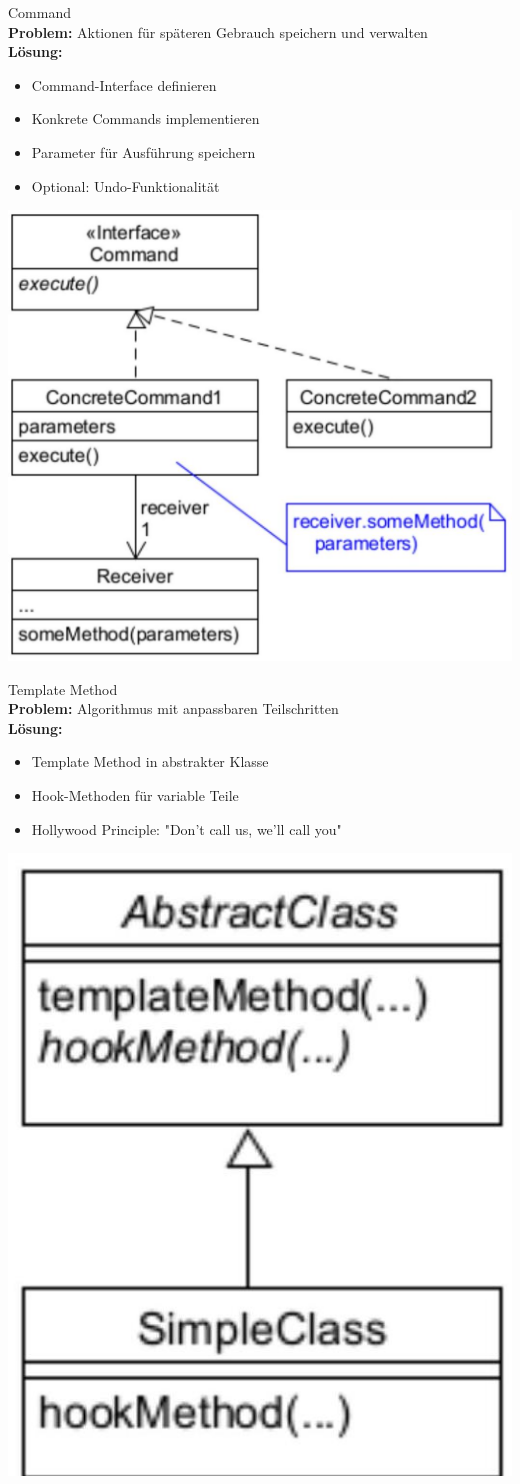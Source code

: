 \begin{concept}{Command}\\
\textbf{Problem:} Aktionen für späteren Gebrauch speichern und verwalten\\
\textbf{Lösung:}
\begin{itemize}
    \item Command-Interface definieren
    \item Konkrete Commands implementieren
    \item Parameter für Ausführung speichern
    \item Optional: Undo-Funktionalität
\end{itemize}
\includegraphics[width=0.7\linewidth]{images/2025_01_02_73d93f10fa91ab6123dcg-19}
\end{concept}


\begin{concept}{Template Method}\\
\textbf{Problem:} Algorithmus mit anpassbaren Teilschritten\\
\textbf{Lösung:}
\begin{itemize}
    \item Template Method in abstrakter Klasse
    \item Hook-Methoden für variable Teile
    \item Hollywood Principle: "Don't call us, we'll call you"
\end{itemize}
\includegraphics[width=0.3\linewidth]{images/2025_01_02_73d93f10fa91ab6123dcg-22}
\end{concept}

